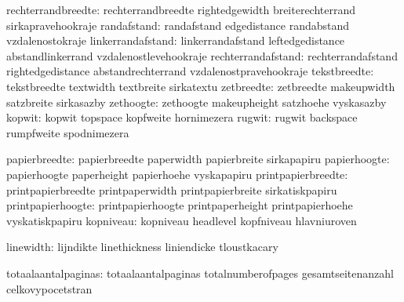            rechterrandbreedte:  rechterrandbreedte           rightedgewidth
                                breiterechterrand            sirkapravehookraje
                  randafstand:  randafstand                  edgedistance
                                randabstand                  vzdalenostokraje
            linkerrandafstand:  linkerrandafstand            leftedgedistance
                                abstandlinkerrand            vzdalenostlevehookraje
           rechterrandafstand:  rechterrandafstand           rightedgedistance
                                abstandrechterrand           vzdalenostpravehookraje
                 tekstbreedte:  tekstbreedte                 textwidth
                                textbreite                   sirkatextu
                   zetbreedte:  zetbreedte                   makeupwidth
                                satzbreite                   sirkasazby
                    zethoogte:  zethoogte                    makeupheight
                                satzhoehe                    vyskasazby
                       kopwit:  kopwit                       topspace
                                kopfweite                    hornimezera
                       rugwit:  rugwit                       backspace
                                rumpfweite                   spodnimezera

                papierbreedte:  papierbreedte                paperwidth
                                papierbreite                 sirkapapiru
                 papierhoogte:  papierhoogte                 paperheight
                                papierhoehe                  vyskapapiru
           printpapierbreedte:  printpapierbreedte           printpaperwidth
                                printpapierbreite            sirkatiskpapiru
            printpapierhoogte:  printpapierhoogte            printpaperheight
                                printpapierhoehe             vyskatiskpapiru
                    kopniveau:  kopniveau                    headlevel
                                kopfniveau                   hlavniuroven

                    linewidth:  lijndikte                    linethickness
                                liniendicke                  tloustkacary

          totaalaantalpaginas:  totaalaantalpaginas          totalnumberofpages
                                gesamtseitenanzahl           celkovypocetstran

\stopcommands

